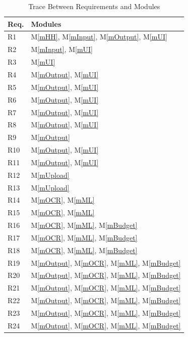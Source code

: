\documentclass[12pt, titlepage]{article}
\newcommand{\mref}[1]{M\ref{#1}}
\begin{document}
\begin{table}[H]
\centering
\begin{tabular}{p{} p{}}
\toprule
\textbf{Req.} & \textbf{Modules}\\
\midrule
R1 & \mref{mHH}, \mref{mInput}, \mref{mOutput}, \mref{mUI}\\
R2 & \mref{mInput}, \mref{mUI}\\
R3 & \mref{mUI}\\
R4 & \mref{mOutput}, \mref{mUI}\\
R5 & \mref{mOutput}, \mref{mUI}\\
R6 & \mref{mOutput}, \mref{mUI}\\
R7 & \mref{mOutput}, \mref{mUI}\\
R8 & \mref{mOutput}, \mref{mUI}\\
R9 & \mref{mOutput}\\
R10 & \mref{mOutput}, \mref{mUI}\\
R11 & \mref{mOutput}, \mref{mUI}\\
R12 & \mref{mUpload}\\
R13 & \mref{mUpload}\\
R14 & \mref{mOCR}, \mref{mML}\\
R15 & \mref{mOCR}, \mref{mML}\\
R16 & \mref{mOCR}, \mref{mML}, \mref{mBudget}\\
R17 & \mref{mOCR}, \mref{mML}, \mref{mBudget}\\
R18 & \mref{mOCR}, \mref{mML}, \mref{mBudget}\\
R19 & \mref{mOutput}, \mref{mOCR}, \mref{mML}, \mref{mBudget}\\
R20 & \mref{mOutput}, \mref{mOCR}, \mref{mML}, \mref{mBudget}\\
R21 & \mref{mOutput}, \mref{mOCR}, \mref{mML}, \mref{mBudget}\\
R22 & \mref{mOutput}, \mref{mOCR}, \mref{mML}, \mref{mBudget}\\
R23 & \mref{mOutput}, \mref{mOCR}, \mref{mML}, \mref{mBudget}\\
R24 & \mref{mOutput}, \mref{mOCR}, \mref{mML}, \mref{mBudget}\\

\bottomrule
\end{tabular}
\caption{Trace Between Requirements and Modules}
\label{TblRT}
\end{table}
\end{document}
